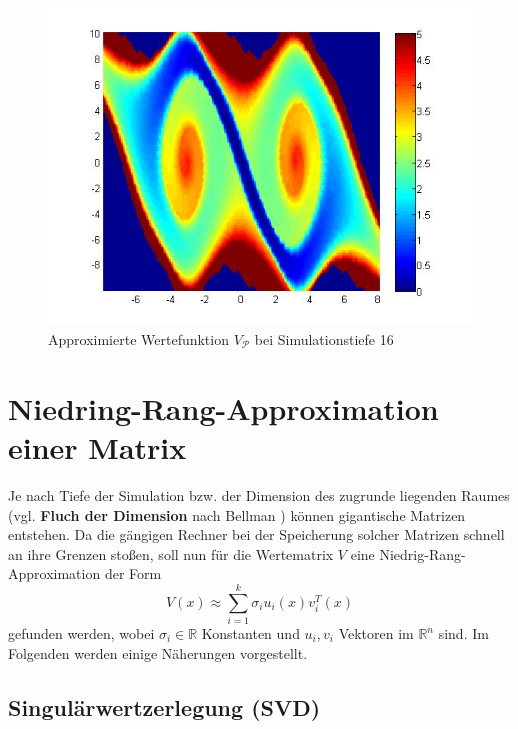 \documentclass[12pt,a4paper,twoside]{article}
\begin{document}
	\begin{figure}[h]
		\center
		\includegraphics[scale=0.55]{valuefunction_plot_256.jpg}
		\caption{Approximierte Wertefunktion $V_\mathcal{P}$ bei Simulationstiefe 16}
	\end{figure}
	\newpage
\section{Niedring-Rang-Approximation einer Matrix}
	Je nach Tiefe der Simulation bzw. der Dimension des zugrunde liegenden Raumes (vgl. \textbf{Fluch der Dimension} 
	nach Bellman \citep{Bellman1961}) können gigantische Matrizen entstehen. Da die gängigen Rechner bei der 
	Speicherung solcher Matrizen schnell an ihre Grenzen stoßen, soll nun für die Wertematrix $V$ eine Niedrig-Rang-
	Approximation der Form
	\begin{equation}
		\label{eq:approx}
		V(x)\approx \sum_{i=1}^k\sigma_i u_i(x) v_i^T(x)
	\end{equation}
	gefunden werden, wobei $\sigma_i\in \mathds{R}$ Konstanten und $u_i, v_i$ Vektoren im $\mathds{R}^n$ sind. Im Folgenden werden einige Näherungen vorgestellt.
	\subsection{Singulärwertzerlegung (SVD)}
\end{document}
